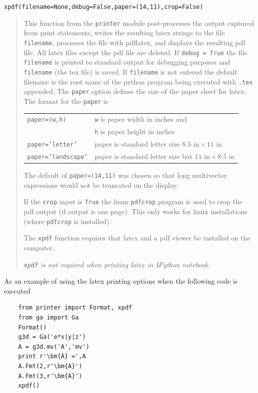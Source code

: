 \documentclass[12pt]{report}
\newcommand{\bm}[1]{\boldsymbol{#1}}
\newcommand{\T}[1]{\texttt{#1}}
\begin{document}
\T{xpdf(filename=None,debug=False,paper=(14,11),crop=False)}
\begin{quote}
   This function from the \T{printer} module post-processes the output captured from
   print statements, writes the resulting latex strings to the file \T{filename},
   processes the file with pdflatex, and displays the resulting pdf file.   All latex files except
   the pdf file are deleted. If \T{debug = True} the file \T{filename} is printed to
   standard output for debugging purposes and \T{filename} (the tex file) is saved.  If \T{filename} is not entered the default
   filename is the root name of the python program being executed with \T{.tex} appended.
   The \T{paper} option defines the size of the paper sheet for latex. The format for the  \T{paper} is
   
   \begin{center}
   \begin{longtable}{ll}
       \T{paper=(w,h)} & \T{w} is paper width in inches and \\
                       & \T{h} is paper height in inches \\
       \T{paper='letter'} & paper is standard letter size $8.5\mbox{ in}\times 11\mbox{ in}$ \\
       \T{paper='landscape'} & paper is standard letter size but $11\mbox{ in}\times 8.5\mbox{ in}$
   \end{longtable}
   \end{center}

   The default of \T{paper=(14,11)} was chosen so that long multivector expressions would not be truncated on the display.
   
   If the \T{crop} input is \T{True} the linux \T{pdfcrop} program is used to crop the pdf output (if output is one page).  This only works
   for linux installations (where \T{pdfcrop} is installed). 
   
   The \T{xpdf} function requires that latex and a pdf viewer be installed on
   the computer.
   
   \emph{\T{xpdf} is not required when printing latex in IPython notebook.}
\end{quote}

As an example of using the latex printing options when the following code is
executed

\begin{lstlisting}
    from printer import Format, xpdf
    from ga import Ga
    Format()
    g3d = Ga('e*x|y|z')
    A = g3d.mv('A','mv')
    print r'\bm{A} =',A
    A.Fmt(2,r'\bm{A}')
    A.Fmt(3,r'\bm{A}')
    xpdf()
\end{lstlisting}
\end{document}
